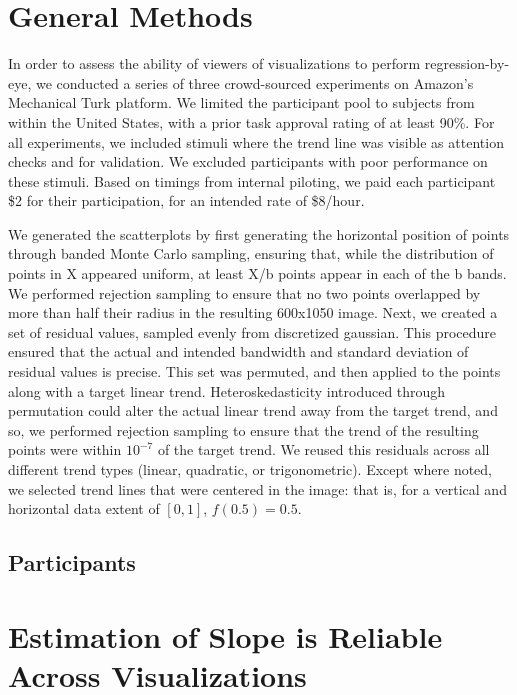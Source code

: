 \documentclass{sigchi}
\begin{document}
\section{General Methods}

In order to assess the ability of viewers of visualizations to perform regression-by-eye, we conducted a series of three crowd-sourced experiments on Amazon's Mechanical Turk platform. We limited the participant pool to subjects from within the United States, with a prior task approval rating of at least 90\%. For all experiments, we included stimuli where the trend line was visible as attention checks and for validation. We excluded participants with poor performance on these stimuli. Based on timings from internal piloting, we paid each participant \$2 for their participation, for an intended rate of \$8/hour. 

We generated the scatterplots by first generating the horizontal position of points through banded Monte Carlo sampling, ensuring that, while the distribution of points in X appeared uniform, at least X/b points appear in each of the b bands. We performed rejection sampling to ensure that no two points overlapped by more than half their radius in the resulting 600x1050 image. Next, we created a set of residual values, sampled evenly from discretized gaussian. This procedure ensured that the actual and intended bandwidth and standard deviation of residual values is precise. This set was permuted, and then applied to the points along with a target linear trend. Heteroskedasticity introduced through permutation could alter the actual linear trend away from the target trend, and so, we performed rejection sampling to ensure that the trend of the resulting points were within $10^{-7}$ of the target trend. We reused this residuals across all different trend types (linear, quadratic, or trigonometric). Except where noted, we selected trend lines that were centered in the image: that is, for a vertical and horizontal data extent of $[0,1]$, $f(0.5) = 0.5$.

\subsection{Participants}


\section{Estimation of Slope is Reliable \\ Across Visualizations}
\end{document}
